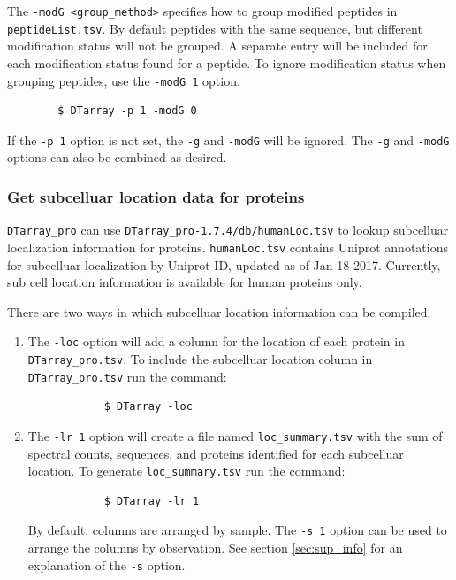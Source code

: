 \documentclass[12pt]{article}
\newcommand{\VERSION}{1.7.4}
\begin{document}
	\noindent
	The \texttt{-modG <group\_method>} specifies how to group modified peptides in \texttt{peptideList.tsv}.  By default peptides  with  the  same sequence, but different modification status will not be grouped. A separate entry will be  included for each modification status found for a peptide. To ignore modification status when grouping peptides, use the \texttt{-modG 1} option.
	
	\begin{lstlisting}
		$ DTarray -p 1 -modG 0
	\end{lstlisting}
	
	\noindent
	If the \texttt{-p 1} option is not set, the \texttt{-g} and \texttt{-modG} will be ignored. The \texttt{-g} and \texttt{-modG} options can also be combined as desired.  
	
	\subsubsection{Get subcelluar location data for proteins} \label{sec:loc}
	
	\texttt{DTarray\_pro} can use \texttt{DTarray\_pro-\VERSION/db/humanLoc.tsv}  to lookup subcelluar localization information for proteins.  \texttt{humanLoc.tsv} contains Uniprot annotations for subcelluar localization by Uniprot ID,	updated as of Jan 18 2017. Currently, sub cell location information
	is available for human proteins only.
	
	\bigskip
	\noindent
	There are two ways in which subcelluar location information can be compiled.
	
	\begin{enumerate}
		\item The \texttt{-loc} option will add a column for the location of each protein in \texttt{DTarray\_pro.tsv}.  To include the subcelluar location column in \texttt{DTarray\_pro.tsv} run the command:
		
		\begin{lstlisting}
			$ DTarray -loc
		\end{lstlisting}

		\item The \texttt{-lr 1} option will create a file named \texttt{loc\_summary.tsv} with the sum of spectral counts, sequences, and proteins identified for each subcelluar location.  To generate \texttt{loc\_summary.tsv} run the command:
		
		\begin{lstlisting}
			$ DTarray -lr 1
		\end{lstlisting}
		
		\noindent
		By default, columns are arranged by sample.  The \texttt{-s 1} option can be used to arrange the columns by observation.  See section \ref{sec:sup_info} for an explanation of the \texttt{-s} option.  
	
	\end{enumerate}
	
\end{document}
